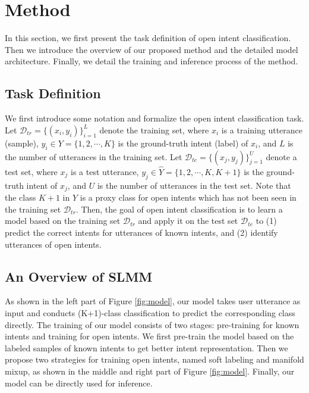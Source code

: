 \documentclass[journal]{IEEEtran}
\begin{document}
\section{Method}
In this section, we first present the task definition of open intent classification.
Then we introduce the overview of our proposed method and the detailed model architecture.
Finally, we detail the training and inference process of the method. 
\subsection{Task Definition}
We first introduce some notation and formalize the open intent classification task.
Let $\mathcal{D}_{tr} = \{(x_i,y_i)\}_{i=1}^{L}$ denote the training set, where $x_i$ is a training utterance (sample), $y_i \in Y = \{1,2,\cdots,K\}$ is the ground-truth intent (label) of $x_i$, and $L$ is the number of utterances in the training set.
Let $\mathcal{D}_{te} = \{(x_j,y_j)\}_{j=1}^{U}$ denote a test set, where $x_j$ is a test utterance, $y_j \in \hat{Y} = \{1,2,\cdots,K,K+1\}$ is the ground-truth intent of $x_j$, and $U$ is the number of utterances in the test set.
Note that the class $K+1$ in $\hat{Y}$ is a proxy class for open intents which has not been seen in the training set $\mathcal{D}_{tr}$.
Then, the goal of open intent classification is to learn a model based on the training set $\mathcal{D}_{tr}$ and apply it on the test set $\mathcal{D}_{te}$ to (1) predict the correct intents for utterances of known intents, and (2) identify utterances of open intents.

\subsection{An Overview of SLMM}
As shown in the left part of Figure \ref{fig:model}, our model takes user utterance as input and conducts (K+1)-class classification to predict the corresponding class directly.
The training of our model consists of two stages: pre-training for known intents and training for open intents.
We first pre-train the model based on the labeled samples of known intents to get better intent representation.
Then we propose two strategies for training open intents, named soft labeling and manifold mixup, as shown in the middle and right part of Figure \ref{fig:model}.
Finally, our model can be directly used for inference.
\end{document}

